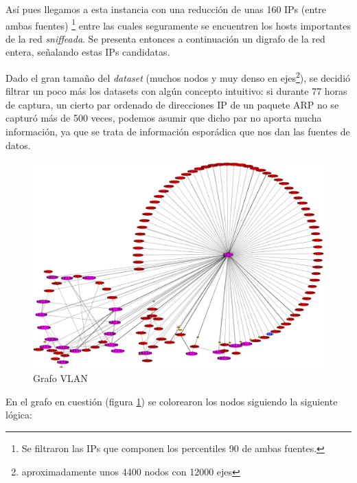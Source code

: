 \par As\'i pues llegamos a esta instancia con una reducci\'on de unas 160 IPs (entre ambas fuentes)%
\footnote{Se filtraron las IPs que componen los percentiles 90 de ambas fuentes.}
entre las cuales seguramente se encuentren los hosts importantes de la red \textit{sniffeada}. Se
presenta entonces a continuaci\'on un digrafo de la red entera, se\~nalando estas IPs candidatas.

\par Dado el gran tama\~no del \textit{dataset} (muchos nodos y muy denso en ejes\footnote{%
aproximadamente unos 4400 nodos con 12000 ejes}), se decidi\'o filtrar un poco m\'as los datasets
con alg\'un concepto intuitivo: si durante 77 horas de captura, un cierto par ordenado de direcciones
IP de un paquete ARP no se captur\'o m\'as de 500 veces, podemos asumir que dicho par no aporta
mucha informaci\'on, ya que se trata de informaci\'on espor\'adica que nos dan las fuentes de
datos.

\begin{figure}[!t]
    \centering
    \includegraphics[width=\textwidth]{img/graph/escenario_1/vlan10/vlan10_500toEnd}
    \caption{Grafo VLAN }
    \label{fig:vlan10_grafo}
\end{figure}

\par En el grafo en cuesti\'on (figura \ref{fig:vlan10_grafo}) se colorearon los nodos
siguiendo la siguiente l\'ogica:

